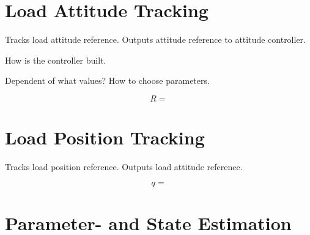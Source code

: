 \section{Load Attitude Tracking}

Tracks load attitude reference. Outputs attitude reference to attitude controller.
	
How is the controller built.

Dependent of what values? 	How to choose parameters.

\begin{figure}[h!]
	\centering
	\caption{\label{fig:con.loadattloop}}
\end{figure}		

\begin{equation}\label{eq:con.R}
R = 
\end{equation}

\section{Load Position Tracking}


Tracks load position reference. Outputs load attitude reference.

\begin{equation}\label{eq:con.q}
q =
\end{equation}

\begin{figure}[h!]
	\centering
	\caption{\label{fig:con.loadposloop}}
\end{figure}		

\section{Parameter- and State Estimation}

